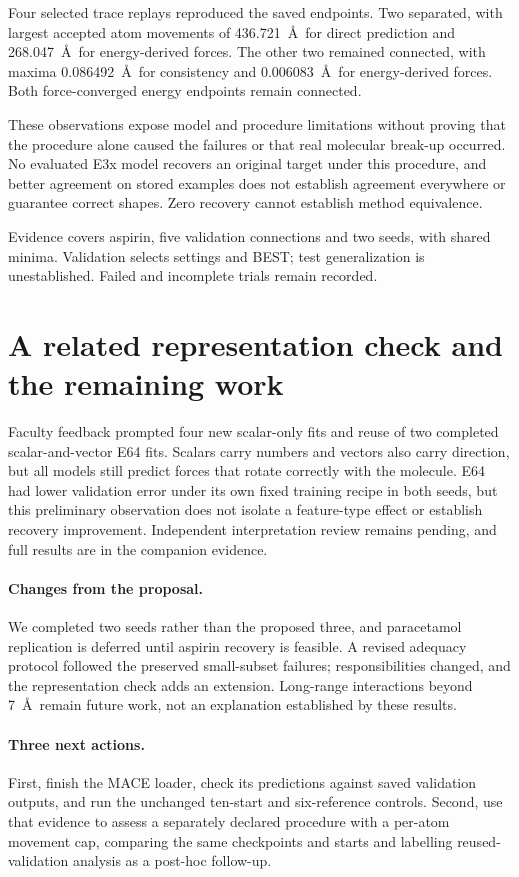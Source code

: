 \documentclass{article}
\begin{document}
Four selected trace replays reproduced the saved endpoints. Two separated, with largest accepted atom movements of 436.721~\AA\ for direct prediction and 268.047~\AA\ for energy-derived forces. The other two remained connected, with maxima 0.086492~\AA\ for consistency and 0.006083~\AA\ for energy-derived forces. Both force-converged energy endpoints remain connected.

These observations expose model and procedure limitations without proving that the procedure alone caused the failures or that real molecular break-up occurred. No evaluated E3x model recovers an original target under this procedure, and better agreement on stored examples does not establish agreement everywhere or guarantee correct shapes. Zero recovery cannot establish method equivalence.

Evidence covers aspirin, five validation connections and two seeds, with shared minima. Validation selects settings and BEST; test generalization is unestablished. Failed and incomplete trials remain recorded.

\section{A related representation check and the remaining work}
Faculty feedback prompted four new scalar-only fits and reuse of two completed scalar-and-vector E64 fits. Scalars carry numbers and vectors also carry direction, but all models still predict forces that rotate correctly with the molecule. E64 had lower validation error under its own fixed training recipe in both seeds, but this preliminary observation does not isolate a feature-type effect or establish recovery improvement. Independent interpretation review remains pending, and full results are in the companion evidence.

\paragraph{Changes from the proposal.}
We completed two seeds rather than the proposed three, and paracetamol replication is deferred until aspirin recovery is feasible. A revised adequacy protocol followed the preserved small-subset failures; responsibilities changed, and the representation check adds an extension. Long-range interactions beyond 7~\AA\ remain future work, not an explanation established by these results.
\paragraph{Three next actions.}
First, finish the MACE loader, check its predictions against saved validation outputs, and run the unchanged ten-start and six-reference controls. Second, use that evidence to assess a separately declared procedure with a per-atom movement cap, comparing the same checkpoints and starts and labelling reused-validation analysis as a post-hoc follow-up.
\end{document}
